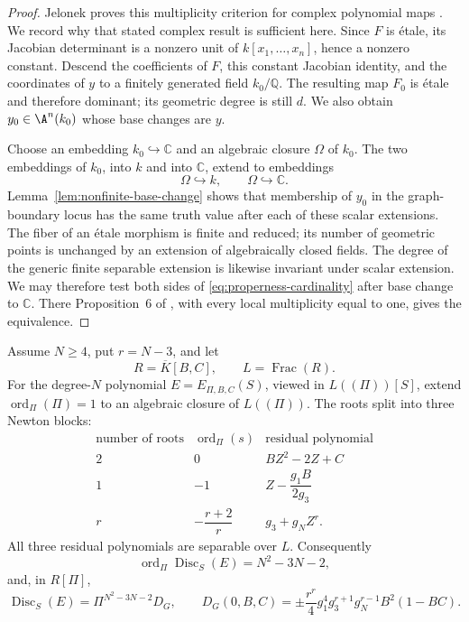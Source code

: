 \begin{proof}
Jelonek proves this multiplicity criterion for complex polynomial maps
\cite[Proposition~6]{Jelonek1993}.  We record why that stated complex result
is sufficient here.  Since \(F\) is \'etale, its Jacobian determinant is a
nonzero unit of \(k[x_1,\ldots,x_n]\), hence a nonzero constant.  Descend the
coefficients of \(F\), this constant Jacobian identity, and the coordinates
of \(y\) to a finitely generated field \(k_0/\mathbb Q\).  The resulting map
\(F_0\) is \'etale and therefore dominant; its geometric degree is still
\(d\).  We also obtain \(y_0\in\A^n(k_0)\) whose base changes are \(y\).

Choose an embedding \(k_0\hookrightarrow\mathbb C\) and an algebraic closure
\(\Omega\) of \(k_0\).  The two embeddings of \(k_0\), into \(k\) and into
\(\mathbb C\), extend to embeddings
\[
 \Omega\hookrightarrow k,\qquad \Omega\hookrightarrow\mathbb C.
\]
Lemma~\ref{lem:nonfinite-base-change} shows that membership of \(y_0\) in
the graph-boundary locus has the same truth value after each of these scalar
extensions.  The fiber of an \'etale morphism is finite and reduced; its
number of geometric points is unchanged by an extension of algebraically
closed fields.  The degree of the generic finite separable extension is
likewise invariant under scalar extension.  We may therefore test both
sides of \eqref{eq:properness-cardinality} after base change to
\(\mathbb C\).  There Proposition~6 of \cite{Jelonek1993}, with every local
multiplicity equal to one, gives the equivalence.
\end{proof}

\begin{lemma}
\label{lem:exact-discriminant-order}
Assume \(N\geq4\), put \(r=N-3\), and let
\[
 R=\overline K[B,C],\qquad L=\operatorname{Frac}(R).
\]
For the degree-\(N\) polynomial \(E=E_{\Pi,B,C}(S)\), viewed in
\(L((\Pi))[S]\), extend \(\operatorname{ord}_\Pi(\Pi)=1\) to an algebraic
closure of \(L((\Pi))\).  The roots split into three Newton blocks:
\begin{equation}
\begin{array}{c|c|c}
\text{number of roots}&\operatorname{ord}_\Pi(s)&
 \text{residual polynomial}\\ \hline
2&0&BZ^2-2Z+C\\
1&-1&Z-\dfrac{g_1B}{2g_3}\\[4pt]
r&-\dfrac{r+2}{r}&g_3+g_NZ^r.
\end{array}
\label{eq:newton-blocks}
\end{equation}
All three residual polynomials are separable over \(L\).  Consequently
\[
 \operatorname{ord}_\Pi\operatorname{Disc}_S(E)
 =N^2-3N-2,
\]
and, in \(R[\Pi]\),
\[
 \operatorname{Disc}_S(E)=\Pi^{N^2-3N-2}D_G,\qquad
 D_G(0,B,C)=
 \pm\frac{r^r}{4}g_1^4g_3^{r+1}g_N^{r-1}B^2(1-BC).
\]
\end{lemma}

